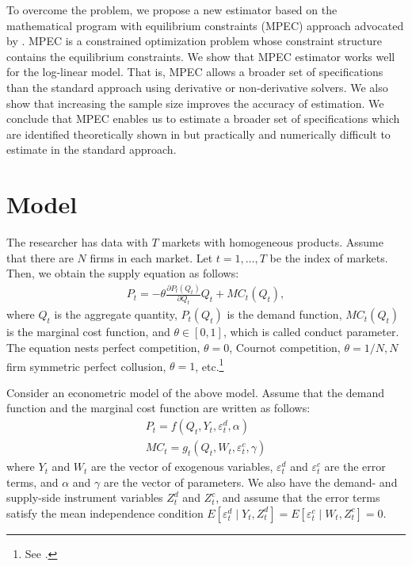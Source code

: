 \documentclass[11pt, a4paper]{article}
\begin{document}
To overcome the problem, we propose a new estimator based on the mathematical program with equilibrium constraints (MPEC) approach advocated by \cite{su2012constrained}. 
MPEC is a constrained optimization problem whose constraint structure contains the equilibrium constraints. 
We show that MPEC estimator works well for the log-linear model. 
That is, MPEC allows a broader set of specifications than the standard approach using derivative or non-derivative solvers. 
We also show that increasing the sample size improves the accuracy of estimation.
We conclude that MPEC enables us to estimate a broader set of specifications which are identified theoretically shown in \cite{lau1982identifying} but practically and numerically difficult to estimate in the standard approach.


\section{Model}
The researcher has data with $T$ markets with homogeneous products.
Assume that there are $N$ firms in each market.
Let $t = 1,\ldots, T$ be the index of markets.
Then, we obtain the supply equation as follows:
\begin{align}
     P_t = -\theta\frac{\partial P_t(Q_{t})}{\partial Q_{t}}Q_{t} + MC_t(Q_{t}),\label{eq:supply_equation}
\end{align}
where $Q_{t}$ is the aggregate quantity, $P_t(Q_{t})$ is the demand function, $MC_{t}(Q_{t})$ is the marginal cost function, and $\theta\in[0,1]$, which is called conduct parameter. 
The equation nests perfect competition, $\theta=0$, Cournot competition, $\theta=1/N, N$ firm symmetric perfect collusion, $\theta=1$, etc.\footnote{See \cite{bresnahan1982oligopoly}.} 

Consider an econometric model of the above model.
Assume that the demand function and the marginal cost function are written as follows: 
\begin{align}
    P_t = f(Q_{t}, Y_t, \varepsilon^{d}_{t}, \alpha) \label{eq:demand}\\
    MC_t = g_{t}(Q_{t}, W_{t}, \varepsilon^{c}_{t}, \gamma)\label{eq:marginal_cost}
\end{align}
where $Y_t$ and $W_{t}$ are the vector of exogenous variables, $\varepsilon^{d}_{t}$ and $\varepsilon^{c}_{t}$ are the error terms, and $\alpha$ and $\gamma$ are the vector of parameters.
We also have the demand- and supply-side instrument variables $Z^{d}_{t}$ and $Z^{c}_{t}$, and assume that the error terms satisfy the mean independence condition $E[\varepsilon^{d}_{t}\mid Y_t, Z^{d}_{t}] = E[\varepsilon^{c}_{t} \mid W_{t}, Z^{c}_{t}] =0$.
\end{document}
